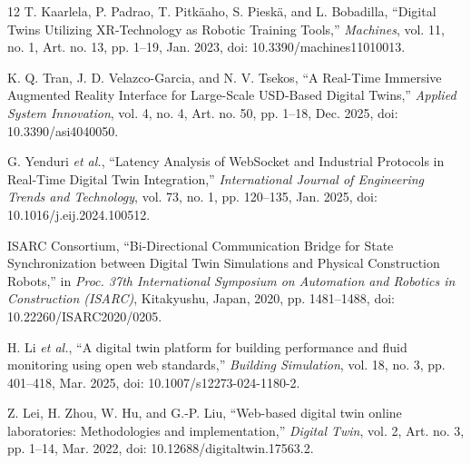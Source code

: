 \documentclass[conference]{IEEEtran}
\begin{document}
\begin{thebibliography}{12}
T. Kaarlela, P. Padrao, T. Pitk\"aaho, S. Piesk\"a, and L. Bobadilla, ``Digital Twins Utilizing XR-Technology as Robotic Training Tools,'' \emph{Machines}, vol. 11, no. 1, Art. no. 13, pp. 1--19, Jan. 2023, doi: 10.3390/machines11010013.

K. Q. Tran, J. D. Velazco-Garcia, and N. V. Tsekos, ``A Real-Time Immersive Augmented Reality Interface for Large-Scale USD-Based Digital Twins,'' \emph{Applied System Innovation}, vol. 4, no. 4, Art. no. 50, pp. 1--18, Dec. 2025, doi: 10.3390/asi4040050.

G. Yenduri \emph{et al.}, ``Latency Analysis of WebSocket and Industrial Protocols in Real-Time Digital Twin Integration,'' \emph{International Journal of Engineering Trends and Technology}, vol. 73, no. 1, pp. 120--135, Jan. 2025, doi: 10.1016/j.eij.2024.100512.

ISARC Consortium, ``Bi-Directional Communication Bridge for State Synchronization between Digital Twin Simulations and Physical Construction Robots,'' in \emph{Proc. 37th International Symposium on Automation and Robotics in Construction (ISARC)}, Kitakyushu, Japan, 2020, pp. 1481--1488, doi: 10.22260/ISARC2020/0205.

H. Li \emph{et al.}, ``A digital twin platform for building performance and fluid monitoring using open web standards,'' \emph{Building Simulation}, vol. 18, no. 3, pp. 401--418, Mar. 2025, doi: 10.1007/s12273-024-1180-2.

Z. Lei, H. Zhou, W. Hu, and G.-P. Liu, ``Web-based digital twin online laboratories: Methodologies and implementation,'' \emph{Digital Twin}, vol. 2, Art. no. 3, pp. 1--14, Mar. 2022, doi: 10.12688/digitaltwin.17563.2.
\end{thebibliography}
\end{document}
